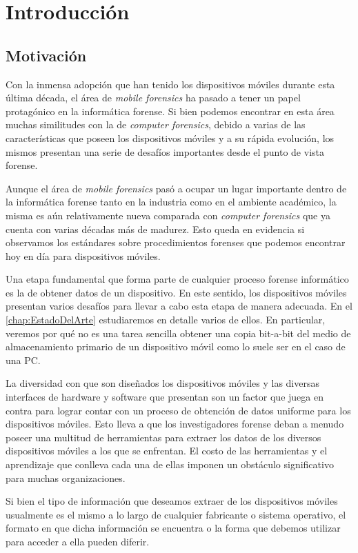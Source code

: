 \chapter{Introducción} \label{introduccion}

\section{Motivación}
Con la inmensa adopción que han tenido los dispositivos móviles durante esta última década, el área de \emph{mobile forensics} ha pasado a tener un papel protagónico en la informática forense. Si bien podemos encontrar en esta área muchas similitudes con la de \emph{computer forensics}, debido a varias de las características que poseen los dispositivos móviles y a su rápida evolución, los mismos presentan una serie de desafíos importantes desde el punto de vista forense.

Aunque el área de \emph{mobile forensics} pasó a ocupar un lugar importante dentro de la informática forense tanto en la industria como en el ambiente académico, la misma es aún relativamente nueva comparada con \emph{computer forensics} que ya cuenta con varias décadas más de madurez. Esto queda en evidencia si observamos los estándares sobre procedimientos forenses que podemos encontrar hoy en día para dispositivos móviles.

Una etapa fundamental que forma parte de cualquier proceso forense informático es la de obtener datos de un dispositivo. En este sentido, los dispositivos móviles presentan varios desafíos para llevar a cabo esta etapa de manera adecuada. En el \autoref{chap:EstadoDelArte} estudiaremos en detalle varios de ellos. En particular, veremos por qué no es una tarea sencilla obtener una copia bit-a-bit del medio de almacenamiento primario de un dispositivo móvil como lo suele ser en el caso de una PC.

La diversidad con que son diseñados los dispositivos móviles y las diversas interfaces de hardware y software que presentan son un factor que juega en contra para lograr contar con un proceso de obtención de datos uniforme para los dispositivos móviles. Esto lleva a que los investigadores forense deban a menudo poseer una multitud de herramientas para extraer los datos de los diversos dispositivos móviles a los que se enfrentan. El costo de las herramientas y el aprendizaje que conlleva cada una de ellas imponen un obstáculo significativo para muchas organizaciones.

Si bien el tipo de información que deseamos extraer de los dispositivos móviles usualmente es el mismo a lo largo de cualquier fabricante o sistema operativo, el formato en que dicha información se encuentra o la forma que debemos utilizar para acceder a ella pueden diferir.

